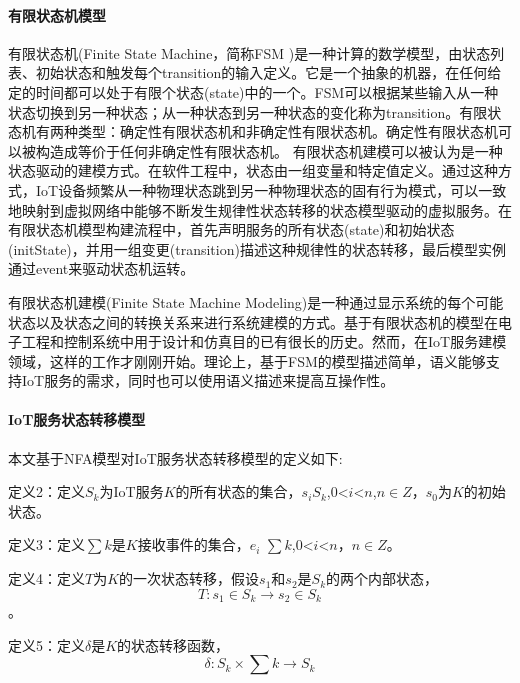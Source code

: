 \documentclass[winfonts,master,twoside]{njuthesis}
\begin{document}
\paragraph{有限状态机模型}
有限状态机(Finite State Machine，简称FSM )\cite{fsmwiki}是一种计算的数学模型，由状态列表、初始状态和触发每个transition的输入定义。它是一个抽象的机器，在任何给定的时间都可以处于有限个状态(state)中的一个。FSM可以根据某些输入从一种状态切换到另一种状态；从一种状态到另一种状态的变化称为transition。有限状态机有两种类型：确定性有限状态机和非确定性有限状态机。确定性有限状态机可以被构造成等价于任何非确定性有限状态机。
有限状态机建模可以被认为是一种状态驱动的建模方式。在软件工程中，状态由一组变量和特定值定义。通过这种方式，IoT设备频繁从一种物理状态跳到另一种物理状态的固有行为模式，可以一致地映射到虚拟网络中能够不断发生规律性状态转移的状态模型驱动的虚拟服务。在有限状态机模型构建流程中，首先声明服务的所有状态(state)和初始状态(initState)，并用一组变更(transition)描述这种规律性的状态转移，最后模型实例通过event来驱动状态机运转。

有限状态机建模(Finite State Machine Modeling)\cite{fsm}是一种通过显示系统的每个可能状态以及状态之间的转换关系来进行系统建模的方式。基于有限状态机的模型在电子工程和控制系统中用于设计和仿真目的已有很长的历史。然而，在IoT服务建模领域，这样的工作才刚刚开始。理论上，基于FSM的模型描述简单，语义能够支持IoT服务的需求，同时也可以使用语义描述来提高互操作性。

\paragraph{IoT服务状态转移模型}

本文基于NFA模型对IoT服务状态转移模型的定义如下:

定义2：定义$S_k$为IoT服务$K$的所有状态的集合，$s_i$\in $S_k$,0<$i$<$n$,$n \in Z $，$s_0$为$K$的初始状态。

定义3：定义$\sum k$是$K$接收事件的集合，$e_i$ \in $\sum k$,0<$i$<$n$，$n \in Z $。

定义4：定义$T$为$K$的一次状态转移，假设$s_1$和$s_2$是$S_k$的两个内部状态，$$T: s_1\in S_k \rightarrow s_2\in S_k $$。

定义5：定义$\delta$是$K$的状态转移函数，$$\delta: S_k  \times  \sum k \rightarrow S_k $$

\end{document}

